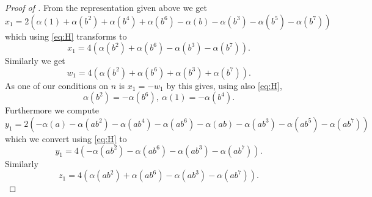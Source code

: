 \documentclass[a4paper,10pt]{amsart}
\theoremstyle{definition}
\theoremstyle{remark}
\begin{document}
\begin{proof}[Proof of ]
From the representation given above we get
\[x_1 = 2(\alpha(1) + \alpha(b^2) + \alpha(b^4) + \alpha(b^6) - \alpha(b) - \alpha(b^3) - \alpha(b^5) - \alpha(b^7)) \]
which using \eqref{eq:H} transforms to 
\begin{equation}\label{eq:x1}
x_1 = 4(\alpha(b^2) + \alpha(b^6) - \alpha(b^3) - \alpha(b^7)).
\end{equation}
Similarly we get
\begin{equation}\label{eq:w1}
w_1 = 4(\alpha(b^2) + \alpha(b^6) + \alpha(b^3) + \alpha(b^7)).
\end{equation}
As one of our conditions on $n$ is $x_1 = -w_1$ by  this gives, using also \eqref{eq:H},
\begin{equation}\label{eq:bgroup}
\alpha(b^2) = -\alpha(b^6), \ \alpha(1) = -\alpha(b^4).
\end{equation}
Furthermore we compute
\[y_1 = 2(-\alpha(a) - \alpha(ab^2) - \alpha(ab^4) - \alpha(ab^6) -\alpha(ab) - \alpha(ab^3) - \alpha(ab^5) - \alpha(ab^7)) \]
which we convert using \eqref{eq:H} to
\begin{equation}\label{eq:y1}
y_1 = 4(-\alpha(ab^2) - \alpha(ab^6) - \alpha(ab^3) - \alpha(ab^7)).
\end{equation}
Similarly
\begin{equation}\label{eq:z1}
z_1 = 4(\alpha(ab^2) + \alpha(ab^6) - \alpha(ab^3) - \alpha(ab^7)).
\end{equation}


\end{proof}
\end{document}
